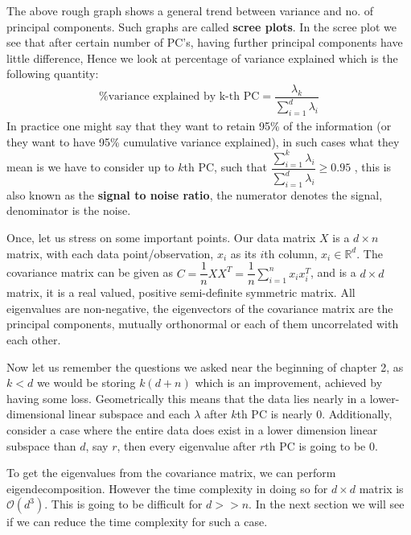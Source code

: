 \documentclass[12pt,a4paper]{article}
\begin{document}
The above rough graph shows a general trend between variance and no. of principal components. Such graphs are called \textbf{scree plots}. In the scree plot we see that after certain number of PC's, having further principal components have little difference, Hence we look at percentage of variance explained which is the following quantity: 
\begin{align}
    \text{\% variance explained by k-th PC} = \dfrac{\lambda_k}{\sum_{i=1}^d\lambda_i}
\end{align}
In practice one might say that they want to retain 95\% of the information (or they want to have 95\% cumulative variance explained), in such cases what they mean is we have to consider up to $k$th PC, such that $\dfrac{\sum_{i=1}^{k} \lambda_i}{\sum_{i=1}^{d}\lambda_i} \geq 0.95$ , this is also known as the \textbf{signal to noise ratio}, the numerator denotes the signal, denominator is the noise.

Once, let us stress on some important points. Our data matrix $X$ is a $d \times n$ matrix, with each data point/observation, $x_i$ as its $i$th column, $x_i \in \mathbb{R}^d$. The covariance matrix can be given as $C = \dfrac{1}{n} X X^T = \dfrac{1}{n} \sum_{i=1}^{n} x_ix_i^T$, and is a $d \times d$ matrix, it is a real valued, positive semi-definite symmetric matrix. All eigenvalues are non-negative, the eigenvectors of the covariance matrix are the principal components, mutually orthonormal or each of them uncorrelated with each other.

Now let us remember the questions we asked near the beginning of chapter 2, as $k<d$ we would be storing $k(d+n)$ which is an improvement, achieved by having some loss. Geometrically this means that the data lies nearly in a lower-dimensional linear subspace and each $\lambda$ after $k$th PC is nearly $0$. Additionally, consider a case where the entire data does exist in a lower dimension linear subspace than $d$, say $r$, then every eigenvalue after $r$th PC is going to be $0$.

To get the eigenvalues from the covariance matrix, we can perform eigendecomposition. However the time complexity in doing so for $d\times d$ matrix is $\mathcal{O}(d^3)$. This is going to be difficult for $d >> n$. In the next section we will see if we can reduce the time complexity for such a case. 
\end{document}
